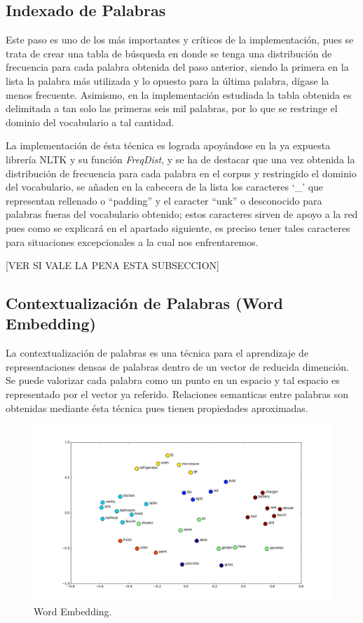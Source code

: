\documentclass[12pt, letterpaper]{article}
\begin{document}
        \subsection{Indexado de Palabras}
        Este paso es uno de los más importantes y críticos de la implementación, pues se trata de crear una tabla de búsqueda en donde se tenga una distribución de frecuencia para cada palabra obtenida del paso anterior, siendo la primera en la lista la  palabra más utilizada y lo opuesto para la última palabra, dígase la menos frecuente. Asimismo, en la implementación estudiada la tabla obtenida es delimitada a tan solo las primeras seis mil palabras, por lo que se restringe el dominio del vocabulario a tal cantidad.
        
        La implementación de ésta técnica es lograda apoyándose en la ya expuesta librería NLTK y su función \emph{FreqDist}, y se ha de destacar que una vez obtenida la distribución de frecuencia para cada palabra en el corpus y restringido el dominio del vocabulario, se añaden en la cabecera de la lista los caracteres ‘\_’ que representan rellenado o “padding” y el caracter “unk” o desconocido para palabras fueras del vocabulario obtenido; estos caracteres sirven de apoyo a la red pues como se explicará en el apartado siguiente, es preciso tener tales caracteres para situaciones excepcionales a la cual nos enfrentaremos.
        
        [VER SI VALE LA PENA ESTA SUBSECCION]
        \subsection{Contextualización de Palabras (Word Embedding)}
        La contextualización de palabras es una técnica para el aprendizaje de representaciones densas de palabras dentro de un vector de reducida dimención. Se puede valorizar cada palabra como un punto en un espacio y tal espacio es representado por el vector ya referido. Relaciones semanticas entre palabras son obtenidas mediante ésta técnica pues tienen propiedades aproximadas.
    
        \begin{figure}[H]
            \centering
            \includegraphics[width=\linewidth]{img/we1.png}
            \caption{Word Embedding.}
        \end{figure}
    
\end{document}
